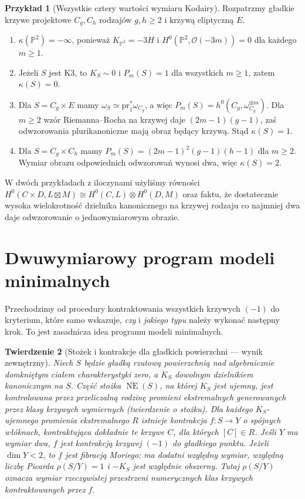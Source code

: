 \documentclass[11pt,a4paper,openany]{report}
\numberwithin{equation}{section}
\theoremstyle{plain}
\newtheorem{twierdzenie}{Twierdzenie}[section]
\theoremstyle{definition}
\newtheorem{przyklad}[twierdzenie]{Przykład}
\theoremstyle{remark}
\newcommand{\PP}{\mathbb P}
\begin{document}
\begin{przyklad}[Wszystkie cztery wartości wymiaru Kodairy]
\label{prz:ga8-kodaira-four}
Rozpatrzmy gładkie krzywe projektowe $C_g,C_h$
rodzajów $g,h\ge2$ i krzywą eliptyczną $E$.
\begin{enumerate}[label=(\roman*)]
\item $\kappa(\PP^2)=-\infty$, ponieważ
$K_{\PP^2}=-3H$ i $H^0(\PP^2,\mathcal O(-3m))=0$
dla każdego $m\ge1$.
\item Jeżeli $S$ jest K3, to $K_S\sim0$ i
$P_m(S)=1$ dla wszystkich $m\ge1$, zatem $\kappa(S)=0$.
\item Dla $S=C_g\times E$ mamy
$\omega_S\simeq\mathrm{pr}_1^*\omega_{C_g}$,
a więc $P_m(S)=h^0(C_g,\omega_{C_g}^{\otimes m})$.
Dla $m\ge2$ wzór Riemanna--Rocha na krzywej
daje $(2m-1)(g-1)$, zaś odwzorowania
plurikanoniczne mają obraz będący krzywą.
Stąd $\kappa(S)=1$.
\item Dla $S=C_g\times C_h$ mamy
$P_m(S)=(2m-1)^2(g-1)(h-1)$ dla $m\ge2$.
Wymiar obrazu odpowiednich odwzorowań wynosi dwa,
więc $\kappa(S)=2$.
\end{enumerate}
W dwóch przykładach z iloczynami użyliśmy równości
$H^0(C\times D,L\boxtimes M)
\cong H^0(C,L)\otimes H^0(D,M)$ oraz faktu,
że dostatecznie wysoka wielokrotność dzielnika
kanonicznego na krzywej rodzaju co najmniej dwa
daje odwzorowanie o jednowymiarowym obrazie.
\end{przyklad}

\section{Dwuwymiarowy program modeli minimalnych}
\label{sec:ga8-surface-mmp}

Przechodzimy od procedury kontraktowania wszystkich
krzywych $(-1)$ do kryterium, które samo wskazuje,
\emph{czy} i \emph{jakiego typu} należy wykonać następny krok.
To jest zasadnicza idea programu modeli minimalnych.

\begin{twierdzenie}[Stożek i kontrakcje dla gładkich powierzchni — wynik zewnętrzny]
\label{tw:ga8-surface-contraction}
Niech $S$ będzie gładką rzutową powierzchnią nad
algebraicznie domkniętym ciałem charakterystyki zero,
a $K_S$ dowolnym dzielnikiem kanonicznym na $S$.
Część stożka $\overline{\operatorname{NE}}(S)$, na której
$K_S$ jest ujemny, jest kontrolowana przez przeliczalną
rodzinę promieni ekstremalnych generowanych przez klasy
krzywych wymiernych (twierdzenie o stożku).
Dla każdego $K_S$-ujemnego promienia ekstremalnego $R$
istnieje kontrakcja $f:S\to Y$ o spójnych włóknach,
kontraktująca dokładnie te krzywe $C$, dla których
$[C]\in R$. Jeśli $Y$ ma wymiar dwa, $f$ jest
kontrakcją krzywej $(-1)$ do gładkiego punktu.
Jeżeli $\dim Y<2$, to $f$ jest \emph{fibracją Moriego}:
ma dodatni względny wymiar, względną liczbę Picarda
$\rho(S/Y)=1$ i $-K_S$ jest względnie obszerny.
Tutaj $\rho(S/Y)$ oznacza wymiar rzeczywistej przestrzeni
numerycznych klas krzywych kontraktowanych przez $f$.
\end{twierdzenie}
\end{document}
